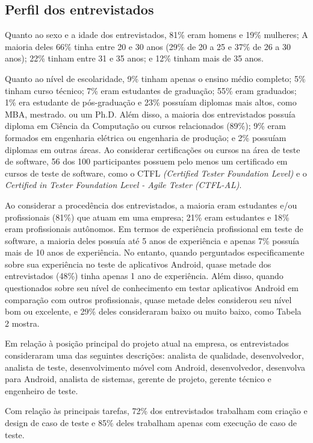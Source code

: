 \subsection{Perfil dos entrevistados}

Quanto ao sexo e a idade dos entrevistados, 81\% eram homens e 19\% mulheres; A maioria deles 66\% tinha entre 20 e 30 anos (29\% de 20 a 25 e 37\% de 26 a 30 anos); 22\% tinham entre 31 e 35 anos; e 12\% tinham mais de 35 anos. 

Quanto ao nível de escolaridade, 9\% tinham apenas o ensino médio completo; 5\% tinham curso técnico; 7\% eram estudantes de graduação; 55\% eram graduados; 1\% era estudante de pós-graduação e 23\% possuíam diplomas mais altos, como MBA, mestrado. ou um Ph.D. Além disso, a maioria dos entrevistados possuía diploma em Ciência da Computação ou cursos relacionados (89\%); 9\% eram formados em engenharia elétrica ou engenharia de produção; e 2\% possuíam diplomas em outras áreas. Ao considerar certificações ou cursos na área de teste de software, 56 dos 100 participantes possuem pelo menos um certificado em cursos de teste de software, como o CTFL \textit{(Certified Tester Foundation Level)} e o \textit{Certified in Tester Foundation Level - Agile Tester (CTFL-AL)}.

Ao considerar a procedência dos entrevistados, a maioria eram estudantes e/ou profissionais (81\%) que atuam em uma empresa; 21\% eram estudantes e 18\% eram profissionais autônomos. Em termos de experiência profissional em teste de software, a maioria deles possuía até 5 anos de experiência e apenas 7\% possuía mais de 10 anos de experiência. No entanto, quando perguntados especificamente sobre sua experiência no teste de aplicativos Android, quase metade dos entrevistados (48\%) tinha apenas 1 ano de experiência. Além disso, quando questionados sobre seu nível de conhecimento em testar aplicativos Android em comparação com outros profissionais, quase metade deles considerou seu nível bom ou excelente, e 29\% deles consideraram baixo ou muito baixo, como Tabela 2 mostra.
 
Em relação à posição principal do projeto atual na empresa, os entrevistados consideraram uma das seguintes descrições: analista de qualidade, desenvolvedor, analista de teste, desenvolvimento móvel com Android, desenvolvedor, desenvolva para Android, analista de sistemas, gerente de projeto, gerente técnico e engenheiro de teste.
 
Com relação às principais tarefas, 72\% dos entrevistados trabalham com criação e design de caso de teste e 85\% deles trabalham apenas com execução de caso de teste.


